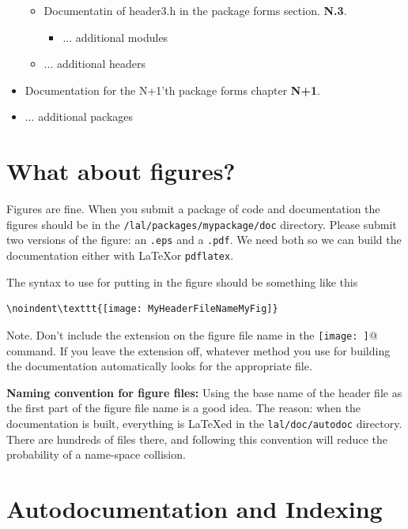 \documentclass[oneside]{book}
\begin{document}
\begin{itemize}
\begin{itemize}
        \item Documentatin of header3.h in the package forms section.
             {\large \bf N.3}.
             \begin{itemize} 
                 \vspace*{-0.051in}
                 \item ... additional modules
             \end{itemize} 
        \vspace*{-0.051in}
        \item ... additional headers
    \end{itemize} 
    \vspace*{-0.1in}
    \item Documentation for the N+1'th package forms chapter {\large \bf N+1}. 
    \item ... additional packages
\end{itemize}


\section{What about figures?}

Figures are fine. When you submit a package of code and documentation
the figures should be in the {\tt /lal/packages/mypackage/doc} directory.
Please submit two versions of the figure: an {\tt .eps} and a {\tt .pdf}.
We need both so we can build the documentation either with 
\LaTeX or {\tt pdflatex}.

The syntax to use for putting in the figure should be something like this
\begin{verbatim}
\noindent\texttt{[image: MyHeaderFileNameMyFig]}
\end{verbatim}
Note. Don't include the extension on the figure file name in
the \verb@\texttt{[image: ]}@ command. If you leave the extension off, 
whatever method you use for building the documentation automatically
looks for the appropriate file.

{\bf Naming convention for figure files:} Using the base name of the
header file as the first part of the figure file name is a good idea.
The reason: when the documentation is built, everything is {\LaTeX}ed
in  the {\tt lal/doc/autodoc} directory. There are hundreds of files there,
and  following this convention will reduce the probability of a
name-space collision.

\section{Autodocumentation and Indexing }
\end{document}
